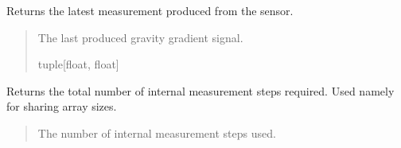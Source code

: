 \documentclass[letterpaper,10pt,english]{sphinxmanual}
\begin{document}
\begin{fulllineitems}
\begin{fulllineitems}
\begin{quote}
\begin{description}
\end{description}\end{quote}

\end{fulllineitems}


\begin{fulllineitems}
\label{\detokenize{modules/quantum/gravity_gradient:qnav.quantum.gravity_gradient.GravityGradiometer.last_measurement}}
\pysigstartsignatures
{}
\pysigstopsignatures
\sphinxAtStartPar
Returns the latest measurement produced from the sensor.
\begin{quote}\begin{description}
\sphinxAtStartPar
The last produced gravity gradient signal.

\sphinxAtStartPar
tuple{[}float, float{]}

\end{description}\end{quote}

\end{fulllineitems}


\begin{fulllineitems}
\label{\detokenize{modules/quantum/gravity_gradient:qnav.quantum.gravity_gradient.GravityGradiometer.num_steps}}
\pysigstartsignatures
{}
\pysigstopsignatures
\sphinxAtStartPar
Returns the total number of internal measurement steps required.
Used namely for sharing array sizes.
\begin{quote}\begin{description}
\sphinxAtStartPar
The number of internal measurement steps used.


\end{description}
\end{quote}
\end{fulllineitems}
\end{fulllineitems}
\end{document}
